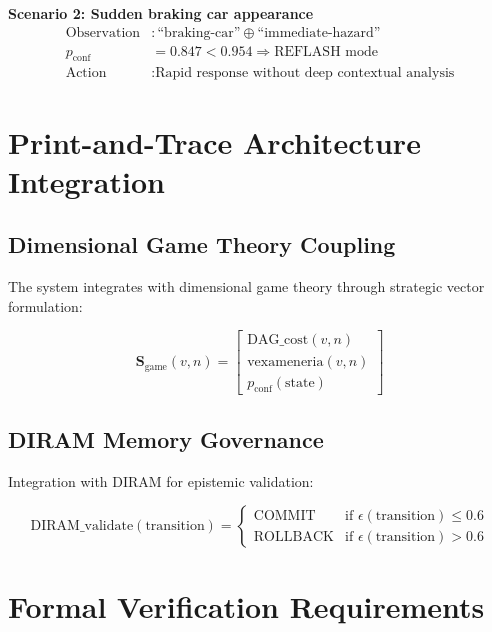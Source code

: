 \documentclass[11pt]{article}
\begin{document}
\textbf{Scenario 2: Sudden braking car appearance}
\begin{align}
\text{Observation} &: \text{``braking-car''} \oplus \text{``immediate-hazard''} \\
p_{\text{conf}} &= 0.847 < 0.954 \Rightarrow \text{REFLASH mode} \\
\text{Action} &: \text{Rapid response without deep contextual analysis}
\end{align}

\section{Print-and-Trace Architecture Integration}

\subsection{Dimensional Game Theory Coupling}

The system integrates with dimensional game theory through strategic vector formulation:

\begin{equation}
\mathbf{S}_{\text{game}}(v,n) = \begin{bmatrix}
\text{DAG\_cost}(v,n) \\
\text{vexameneria}(v,n) \\
p_{\text{conf}}(\text{state})
\end{bmatrix}
\end{equation}

\subsection{DIRAM Memory Governance}

Integration with DIRAM for epistemic validation:

\begin{equation}
\text{DIRAM\_validate}(\text{transition}) = \begin{cases}
\text{COMMIT} & \text{if } \epsilon(\text{transition}) \leq 0.6 \\
\text{ROLLBACK} & \text{if } \epsilon(\text{transition}) > 0.6
\end{cases}
\end{equation}

\section{Formal Verification Requirements}
\end{document}
